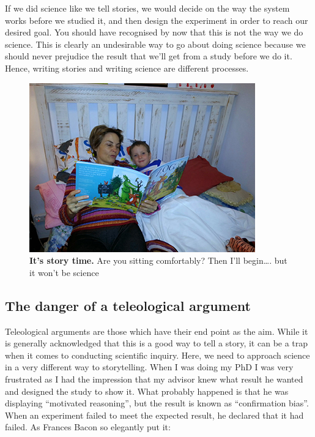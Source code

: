 \documentclass[
]{krantz}
\begin{document}
If we did science like we tell stories, we would decide on the way the system works before we studied it, and then design the experiment in order to reach our desired goal. You should have recognised by now that this is not the way we do science. This is clearly an undesirable way to go about doing science because we should never prejudice the result that we'll get from a study before we do it. Hence, writing stories and writing science are different processes.



\begin{figure}
\includegraphics[width=0.95\linewidth]{figures/Storytelling} \caption{\textbf{It's story time.} Are you sitting comfortably? Then I'll begin\ldots. but it won't be science}\label{fig:Storytelling}
\end{figure}

\hypertarget{the-danger-of-a-teleological-argument}{%
\subsection{The danger of a teleological argument}\label{the-danger-of-a-teleological-argument}}

Teleological arguments are those which have their end point as the aim. While it is generally acknowledged that this is a good way to tell a story, it can be a trap when it comes to conducting scientific inquiry. Here, we need to approach science in a very different way to storytelling. When I was doing my PhD I was very frustrated as I had the impression that my advisor knew what result he wanted and designed the study to show it. What probably happened is that he was displaying ``motivated reasoning'', but the result is known as ``confirmation bias''. When an experiment failed to meet the expected result, he declared that it had failed. As Frances Bacon so elegantly put it:
\end{document}
